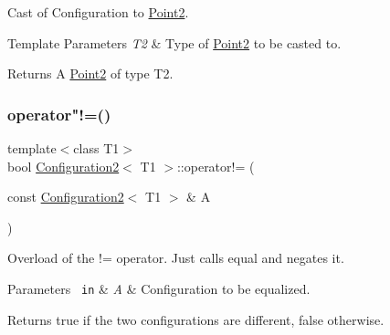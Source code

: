 Cast of Configuration to \mbox{\hyperlink{class_point2}{Point2}}. 


\begin{DoxyTemplParams}{Template Parameters}
{\em T2} & Type of \mbox{\hyperlink{class_point2}{Point2}} to be casted to. \\
\hline
\end{DoxyTemplParams}
\begin{DoxyReturn}{Returns}
A \mbox{\hyperlink{class_point2}{Point2}} of type T2. 
\end{DoxyReturn}
\mbox{\label{class_configuration2_a616d2dd99d9250eeda1bc933e7b0a2da}} 
\subsubsection{\texorpdfstring{operator"!=()}{operator!=()}}
{\footnotesize\ttfamily template$<$class T1$>$ \\
bool \mbox{\hyperlink{class_configuration2}{Configuration2}}$<$ T1 $>$\+::operator!= (\begin{DoxyParamCaption}\item[{const \mbox{\hyperlink{class_configuration2}{Configuration2}}$<$ T1 $>$ \&}]{A }\end{DoxyParamCaption})\hspace{0.3cm}{\ttfamily [inline]}}



Overload of the != operator. Just calls {\ttfamily equal} and negates it. 


\begin{DoxyParams}[1]{Parameters}
\mbox{\texttt{ in}}  & {\em A} & Configuration to be equalized. \\
\hline
\end{DoxyParams}
\begin{DoxyReturn}{Returns}
true if the two configurations are different, false otherwise. 
\end{DoxyReturn}
\mbox{\label{class_configuration2_a9ef2f57ddcc1f0c8117a9ed2f13141aa}} 
